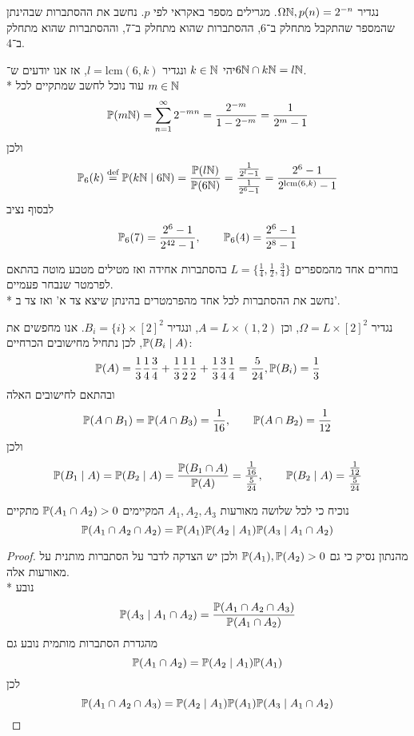 \Subquestion{}
נגדיר $\Omega \mathbb{N}, p(n) = 2^{-n}$.
מגרילים מספר באקראי לפי $p$.
נחשב את ההסתברות שבהינתן שהמספר שהתקבל מתחלק ב־6, ההסתברות שהוא מתחלק ב־7, וההסתברות שהוא מתחלק ב־4.
\begin{solution}
	יהי $k \in \mathbb{N}$ ונגדיר $l = \text{lcm}(6, k)$, אז אנו יודעים ש־$6 \mathbb{N} \cap k \mathbb{N} = l \mathbb{N}$. \\*
	עוד נוכל לחשב שמתקיים לכל $m \in \mathbb{N}$
	\[
		\mathbb{P}(m\mathbb{N})
		= \sum_{n = 1}^{\infty} 2^{-mn}
		= \frac{2^{-m}}{1 - 2^{-m}}
		= \frac{1}{2^m - 1}
	\]
	ולכן
	\[
		\mathbb{P}_6(k) \overset{\text{def}}{=} \mathbb{P}(k \mathbb{N} \mid 6 \mathbb{N})
		= \frac{\mathbb{P}(l \mathbb{N})}{\mathbb{P}(6\mathbb{N})}
		= \frac{\frac{1}{2^l - 1}}{\frac{1}{2^6 - 1}}
		= \frac{2^6 - 1}{2^{\text{lcm}(6, k)} - 1}
	\]
	לבסוף נציב
	\[
		\mathbb{P}_6(7) = \frac{2^6 - 1}{2^{42} - 1},
		\qquad
		\mathbb{P}_6(4) = \frac{2^6 - 1}{2^8 - 1}
	\]
\end{solution}

\Subquestion{}
בוחרים אחד מהמספרים $L = \{ \frac{1}{4}, \frac{1}{2}, \frac{3}{4} \}$ בהסתברות אחידה ואז מטילים מטבע מוטה בהתאם לפרמטר שנבחר פעמיים. \\*
נחשב את ההסתברות לכל אחד מהפרמטרים בהינתן שיצא צד א' ואז צד ב'.
\begin{solution}
	נגדיר $\Omega = L \times {[2]}^2$, וכן $A = L \times (1, 2)$, ונגדיר $B_i = \{ i \} \times {[2]}^2$.
	אנו מחפשים את $\mathbb{P}(B_i \mid A)$, לכן נתחיל מחישובים הכרחיים:
	\[
		\mathbb{P}(A) = \frac{1}{3} \frac{1}{4} \frac{3}{4} + \frac{1}{3} \frac{1}{2} \frac{1}{2} + \frac{1}{3} \frac{3}{4} \frac{1}{4} = \frac{5}{24},
		\mathbb{P}(B_i) = \frac{1}{3}
	\]
	ובהתאם לחישובים האלה
	\[
		\mathbb{P}(A \cap B_1) = \mathbb{P}(A \cap B_3) = \frac{1}{16},
		\qquad
		\mathbb{P}(A \cap B_2) = \frac{1}{12}
	\]
	ולכן
	\[
		\mathbb{P}(B_1 \mid A) = \mathbb{P}(B_2 \mid A)
		= \frac{\mathbb{P}(B_1 \cap A)}{\mathbb{P}(A)}
		= \frac{\frac{1}{16}}{\frac{5}{24}},
		\qquad
		\mathbb{P}(B_2 \mid A) = \frac{\frac{1}{12}}{\frac{5}{24}}
	\]
\end{solution}

\Question{}

\Subquestion{}
נוכיח כי לכל שלושה מאורעות $A_1, A_2, A_3$ המקיימים $\mathbb{P}(A_1 \cap A_2) > 0$ מתקיים
\[
	\mathbb{P}(A_1 \cap A_2 \cap A_2) = \mathbb{P}(A_1) \mathbb{P}(A_2 \mid A_1) \mathbb{P}(A_3 \mid A_1 \cap A_2)
\]
\begin{proof}
	מהנתון נסיק כי גם $\mathbb{P}(A_1), \mathbb{P}(A_2) > 0$ ולכן יש הצדקה לדבר על הסתברות מותנית על מאורעות אלה. \\*
	נובע
	\[
		\mathbb{P}(A_3 \mid A_1 \cap A_2) = \frac{\mathbb{P}(A_1 \cap A_2 \cap A_3)}{\mathbb{P}(A_1 \cap A_2)}
	\]
	מהגדרת הסתברות מותמית נובע גם
	\[
		\mathbb{P}(A_1 \cap A_2) = \mathbb{P}(A_2 \mid A_1) \mathbb{P}(A_1)
	\]
	לכן
	\[
		\mathbb{P}(A_1 \cap A_2 \cap A_3)
		= \mathbb{P}(A_2 \mid A_1) \mathbb{P}(A_1) \mathbb{P}(A_3 \mid A_1 \cap A_2)
	\]
\end{proof}

